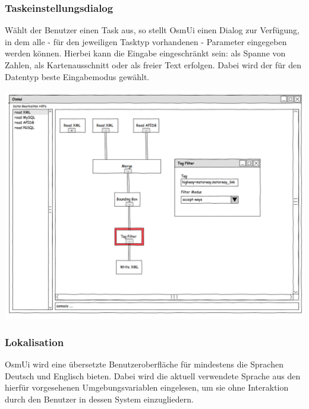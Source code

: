 \documentclass[a4paper,10pt]{scrartcl}
\begin{document}
\subsubsection{Taskeinstellungsdialog}
Wählt der Benutzer einen Task aus, so stellt OsmUi einen Dialog zur Verfügung, in dem alle - für den jeweiligen Tasktyp vorhandenen - Parameter eingegeben werden können.
Hierbei kann die Eingabe eingeschränkt sein: als Spanne von Zahlen, als Kartenausschnitt oder als freier Text erfolgen. Dabei wird der für
den Datentyp beste Eingabemodus gewählt.\\
\begin{center}
\includegraphics[width=15cm]{ui_prototype/OsmUi_Parameter_Optionen.png}
\end{center}
\subsubsection{Lokalisation}
OsmUi wird eine übersetzte Benutzeroberfläche für mindestens die Sprachen Deutsch und Englisch bieten. Dabei wird die aktuell verwendete
Sprache aus den hierfür vorgesehenen Umgebungsvariablen eingelesen, um sie ohne Interaktion durch den Benutzer in dessen System einzugliedern.
\end{document}
